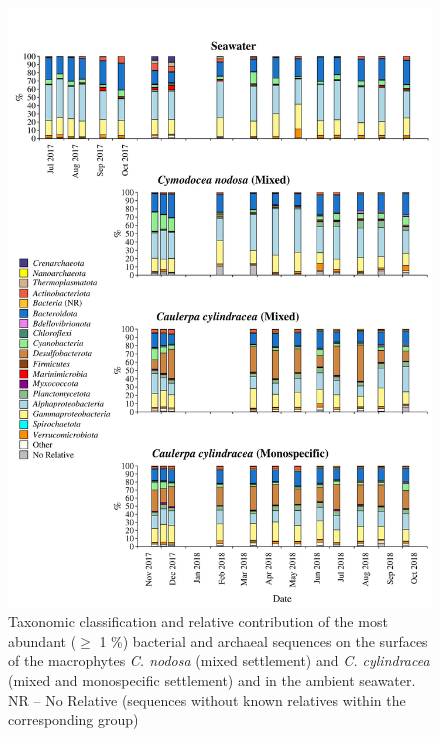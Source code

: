 \documentclass[12pt,]{article}
\begin{document}
\begin{figure}[H]

{\centering \includegraphics[width=0.85\linewidth]{../results/figures/community_bar_plot} 

}

\caption{Taxonomic classification and relative contribution of the most abundant ($\geq$ 1 \si{\percent}) bacterial and archaeal sequences on the surfaces of the macrophytes \textit{C. nodosa} (mixed settlement) and \textit{C. cylindracea} (mixed and monospecific settlement) and in the ambient seawater. NR -- No Relative (sequences without known relatives within the corresponding group)\label{community}}\label{fig:unnamed-chunk-4}
\end{figure}
\end{document}
